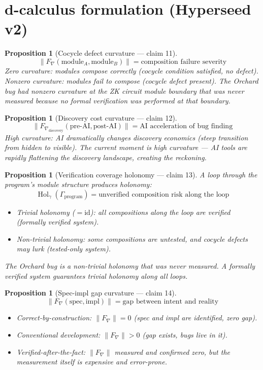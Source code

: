 \documentclass[11pt,a4paper]{article}
\newtheorem{proposition}[definition]{Proposition}
\begin{document}
\section{d-calculus formulation (Hyperseed v2)}

\begin{proposition}[Cocycle defect curvature --- claim 11]
\label{prop:cocycle_curv}
\[
  \|F_\nabla(\text{module}_A, \text{module}_B)\| =
    \text{composition failure severity}
\]
Zero curvature: modules compose correctly (cocycle condition satisfied,
no defect). Nonzero curvature: modules fail to compose (cocycle defect
present). The Orchard bug had nonzero curvature at the ZK circuit
module boundary that was never measured because no formal verification
was performed at that boundary.
\end{proposition}

\begin{proposition}[Discovery cost curvature --- claim 12]
\label{prop:discovery_curv}
\[
  \|F_{\nabla_{\text{discovery}}}(\text{pre-AI}, \text{post-AI})\| =
    \text{AI acceleration of bug finding}
\]
High curvature: AI dramatically changes discovery economics (steep
transition from hidden to visible). The current moment is high
curvature --- AI tools are rapidly flattening the discovery landscape,
creating the reckoning.
\end{proposition}

\begin{proposition}[Verification coverage holonomy --- claim 13]
\label{prop:coverage_hol}
A loop through the program's module structure produces holonomy:
\[
  \operatorname{Hol}_\gamma(\Gamma_{\text{program}}) =
    \text{unverified composition risk along the loop}
\]
\begin{itemize}
  \item Trivial holonomy ($= \mathrm{id}$): all compositions along the
    loop are verified (formally verified system).
  \item Non-trivial holonomy: some compositions are untested, and cocycle
    defects may lurk (tested-only system).
\end{itemize}
The Orchard bug is a non-trivial holonomy that was never measured. A
formally verified system guarantees trivial holonomy along all loops.
\end{proposition}

\begin{proposition}[Spec-impl gap curvature --- claim 14]
\label{prop:gap_curv}
\[
  \|F_\nabla(\text{spec}, \text{impl})\| = \text{gap between intent
    and reality}
\]
\begin{itemize}
  \item Correct-by-construction: $\|F_\nabla\| = 0$ (spec and impl
    are identified, zero gap).
  \item Conventional development: $\|F_\nabla\| > 0$ (gap exists,
    bugs live in it).
  \item Verified-after-the-fact: $\|F_\nabla\|$ measured and confirmed
    zero, but the measurement itself is expensive and error-prone.
\end{itemize}
\end{proposition}
\end{document}
